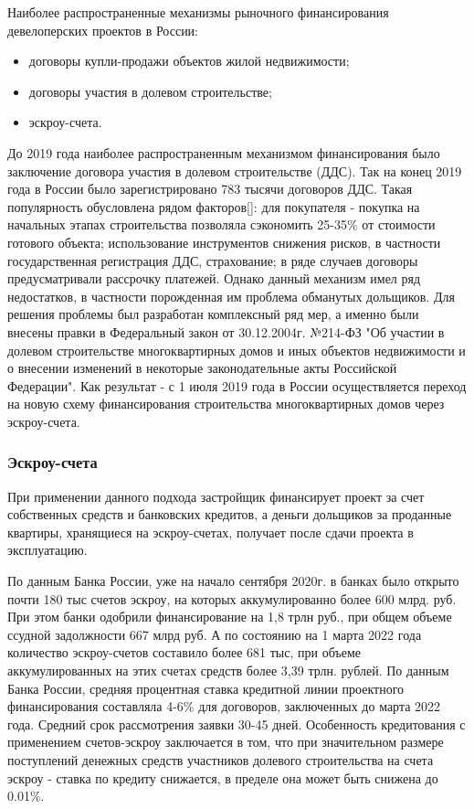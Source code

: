 \documentclass[12pt,a4paper]{article} %
\begin{document}
Наиболее распространенные механизмы рыночного финансирования девелоперских проектов в России:
\begin{itemize}
	\item договоры купли-продажи объектов жилой недвижимости;
	\item договоры участия в долевом строительстве;
	\item эскроу-счета.
\end{itemize}

До 2019 года наиболее распространенным механизмом финансирования было заключение договора участия в долевом строительстве (ДДС). Так на конец 2019 года в России было зарегистрировано 783 тысячи договоров ДДС. Такая популярность обусловлена рядом факторов[]: для покупателя - покупка на начальных этапах строительства позволяла сэкономить 25-35\% от стоимости готового объекта; использование инструментов снижения рисков, в частности государственная регистрация ДДС, страхование; в ряде случаев договоры предусматривали рассрочку платежей. Однако данный механизм имел ряд недостатков, в частности порожденная им проблема обманутых дольщиков. 
Для решения проблемы был разработан комплексный ряд мер, а именно были внесены правки в Федеральный закон от 30.12.2004г. №214-ФЗ "Об участии в долевом строительстве многоквартирных домов и иных объектов недвижимости и о
внесении изменений в некоторые законодательные акты Российской
Федерации". Как результат - с 1 июля 2019 года в России осуществляется переход на новую схему финансирования строительства многоквартирных домов через эскроу-счета.

\subsubsection{Эскроу-счета}

При применении данного подхода застройщик финансирует проект за счет собственных средств и банковских кредитов, а деньги дольщиков за проданные квартиры, хранящиеся на эскроу-счетах,  получает после сдачи проекта в эксплуатацию. 

По данным Банка России, уже на начало сентября 2020г. в банках было открыто почти 180 тыс счетов эскроу, на которых аккумулированно более 600 млрд. руб. При этом банки одобрили финансирование на 1,8 трлн руб., при общем объеме ссудной задолжности 667 млрд руб. А по состоянию на 1 марта 2022 года количество эскроу-счетов составило более 681 тыс, при объеме аккумулированных на этих счетах средств более 3,39 трлн. рублей. 
По данным Банка России, средняя процентная ставка кредитной линии проектного финансирования составляла 4-6\% для договоров, заключенных до марта 2022 года. Средний срок рассмотрения заявки 30-45 дней. Особенность кредитования с применением счетов-эскроу заключается в том, что при значительном размере поступлений денежных средств участников долевого строительства на счета эскроу - ставка по кредиту снижается, в пределе она может быть снижена до 0.01\%.
\end{document}
